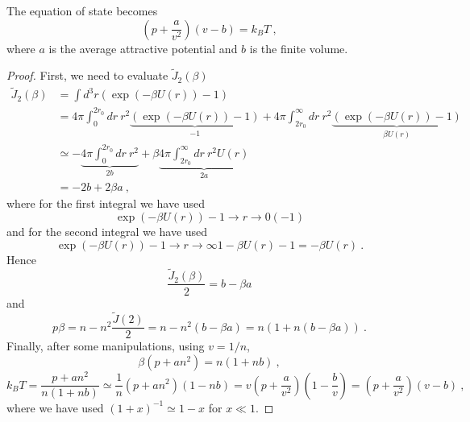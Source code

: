     The equation of state becomes 
    \begin{equation*}
        (p + \frac{a}{v^2}) (v - b) = k_B T ~,
    \end{equation*}
    where $a$ is the average attractive potential and $b$ is the finite volume.
    \begin{proof}
        First, we need to evaluate $\tilde J_2 (\beta)$ 
        \begin{equation*}
        \begin{aligned}
            \tilde J_2 (\beta) & = \int d^3 r (\exp(- \beta U(r)) - 1) \\ & = 4 \pi \int_0^{2r_0} dr ~ r^2 \underbrace{(\exp(- \beta U(r)) - 1)}_{-1} + 4\pi \int_{2r_0}^\infty dr ~ r^2\underbrace{(\exp(- \beta U(r)) - 1)}_{\beta U(r)} \\ & \simeq - \underbrace{4 \pi \int_0^{2r_0} dr ~ r^2}_{2b} + \beta \underbrace{4\pi \int_{2r_0}^\infty dr ~ r^2 U(r)}_{2 a} \\ & = - 2 b + 2 \beta a ~,
        \end{aligned}
        \end{equation*}
        where for the first integral we have used 
        \begin{equation*}
            \exp(-\beta U(r)) - 1 \rightarrow{r \rightarrow 0} (-1) 
        \end{equation*}
        and for the second integral we have used 
        \begin{equation*}
            \exp(-\beta U(r)) - 1 \rightarrow{r \rightarrow \infty} 1 - \beta U(r) - 1 = - \beta U(r) ~.
        \end{equation*}
        Hence 
        \begin{equation*}
            \frac{\tilde J_2(\beta)}{2} = b - \beta a 
        \end{equation*}
        and 
        \begin{equation*}
            p \beta = n - n^2 \frac{\tilde J(2)}{2} = n - n^2 (b - \beta a) = n( 1 + n (b - \beta a)) ~.
        \end{equation*}
        Finally, after some manipulations, using $v = 1 / n$,
        \begin{equation*}
            \beta (p + a n^2) = n (1 + n b) ~,
        \end{equation*}
        \begin{equation*}
            k_B T = \frac{p + a n^2}{n (1 + n b)} \simeq \frac{1}{n}(p + a n^2) (1 - n b) = v (p + \frac{a}{v^2}) (1 - \frac{b}{v}) = (p + \frac{a}{v^2}) (v - b) ~,
        \end{equation*}
        where we have used $(1 + x)^{-1} \simeq 1 - x$ for $x \ll 1$.
    \end{proof}

